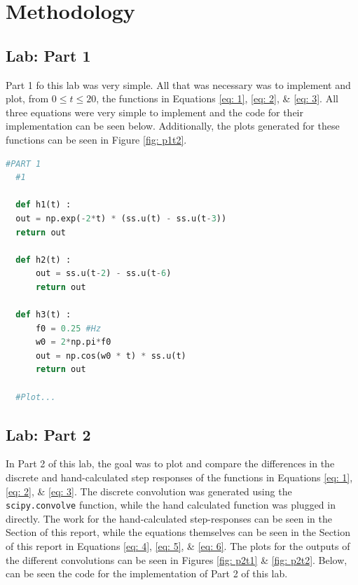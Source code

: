 \documentclass[12pt]{report}
\begin{document}
\section{Methodology}
\subsection{Lab: Part 1}
Part 1 fo this lab was very simple. All that was necessary was to implement and plot, from $0 \leq t \leq 20 $, the functions in Equations \eqref{eq: 1}, \eqref{eq: 2}, \& \eqref{eq: 3}.
All three equations were very simple to implement and the code for their implementation can be seen below. Additionally, the plots generated for these functions can be seen in
Figure \ref{fig: p1t2}.

\begin{lstlisting}[language=Python, basicstyle=\footnotesize]
  #PART 1
  #1

  def h1(t) :
  out = np.exp(-2*t) * (ss.u(t) - ss.u(t-3))
  return out

  def h2(t) :
      out = ss.u(t-2) - ss.u(t-6)
      return out

  def h3(t) :
      f0 = 0.25 #Hz
      w0 = 2*np.pi*f0
      out = np.cos(w0 * t) * ss.u(t)
      return out

  #Plot...
\end{lstlisting}

\subsection{Lab: Part 2}
In Part 2 of this lab, the goal was to plot and compare the differences in the discrete and hand-calculated step responses of the functions in Equations \eqref{eq: 1},
\eqref{eq: 2}, \& \eqref{eq: 3}. The discrete convolution was generated using the \texttt{scipy.convolve} function, while the hand calculated function was plugged in 
directly. The work for the hand-calculated step-responses can be seen in the  Section of this report, while the equations themselves can
be seen in the  Section of this report in Equations \eqref{eq: 4}, \eqref{eq: 5}, \& \eqref{eq: 6}. The plots for the outputs of the
different convolutions can be seen in Figures \ref{fig: p2t1} \& \ref{fig: p2t2}. Below, can be seen the code for the implementation of Part 2 of this lab.
\end{document}
